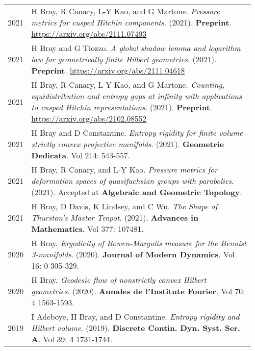
    \medskip


    \medskip
    
    \begin{center}
    {
    \renewcommand{\arraystretch}{1.5}
    \begin{longtable}{p{}  p{}}
    
2021 & 
        H Bray, R Canary, L-Y Kao, and G Martone. \textit{Pressure metrics for cusped Hitchin components}. (2021). 
         \textbf{Preprint}. \url{https://arxiv.org/abs/2111.07493}\\ 

2021 & 
        H Bray and G Tiozzo. \textit{A global shadow lemma and logarithm law for geometrically finite Hilbert geometries}. (2021). 
         \textbf{Preprint}. \url{https://arxiv.org/abs/2111.04618}\\ 

2021 & 
        H Bray, R Canary, L-Y Kao, and G Martone. \textit{Counting, equidistribution and entropy gaps at infinity with applications to cusped Hitchin representations}. (2021). 
         \textbf{Preprint}. \url{https://arxiv.org/abs/2102.08552}\\ 

2021 & 
        H Bray and D Constantine. \textit{Entropy rigidity for finite volume strictly convex projective manifolds}. (2021). 
        \textbf{Geometrie Dedicata}. Vol 214:  543-557.\\ 

2021 & 
        H Bray, R Canary, and L-Y Kao. \textit{Pressure metrics for deformation spaces of quasifuchsian groups with parabolics}. (2021). 
        Accepted at \textbf{Algebraic and Geometric Topology}.\\ 

2021 & 
        H Bray, D Davis, K Lindsey, and C Wu. \textit{The Shape of Thurston's Master Teapot}. (2021). 
        \textbf{Advances in Mathematics}. Vol 377: 107481.\\ 

2020 & 
        H Bray. \textit{Ergodicity of Bowen-Margulis measure for the Benoist 3-manifolds}. (2020). 
        \textbf{Journal of Modern Dynamics}. Vol 16: 0 305-329.\\ 

2020 & 
        H Bray. \textit{Geodesic flow of nonstrictly convex Hilbert geometries}. (2020). 
        \textbf{Annales de l'Institute Fourier}. Vol 70: 4 1563-1593.\\ 

2019 & 
        I Adeboye, H Bray, and D Constantine. \textit{Entropy rigidity and Hilbert volume}. (2019). 
        \textbf{Discrete Contin. Dyn. Syst. Ser. A}. Vol 39: 4 1731-1744.
    \end{longtable}
    } 
    \end{center}

    \vspace{-1em}
    